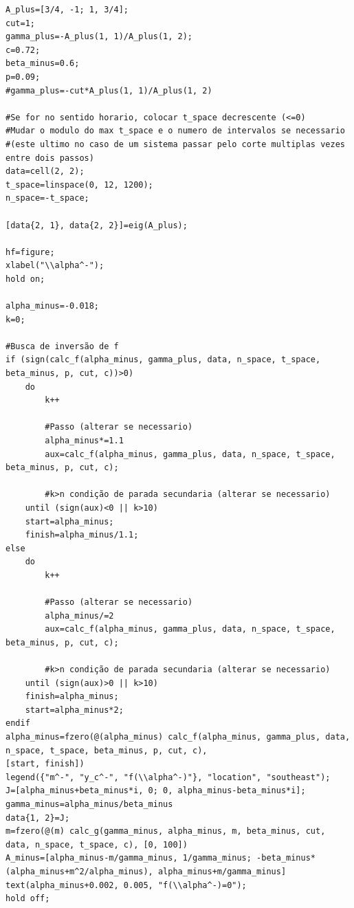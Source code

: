 \begin{lstlisting}[caption={Imposi\c{c}\~{a}o de $f'(\alpha^-)=0$ e $g(m^-)=0$ dado $\gamma^+$, $p$, $c$ e $\beta^-$ fixos.}, captionpos=b]
A_plus=[3/4, -1; 1, 3/4];
cut=1;
gamma_plus=-A_plus(1, 1)/A_plus(1, 2);
c=0.72;
beta_minus=0.6;
p=0.09;
#gamma_plus=-cut*A_plus(1, 1)/A_plus(1, 2)

#Se for no sentido horario, colocar t_space decrescente (<=0)
#Mudar o modulo do max t_space e o numero de intervalos se necessario 
#(este ultimo no caso de um sistema passar pelo corte multiplas vezes entre dois passos)
data=cell(2, 2);
t_space=linspace(0, 12, 1200);
n_space=-t_space;

[data{2, 1}, data{2, 2}]=eig(A_plus);

hf=figure;
xlabel("\\alpha^-");
hold on;

alpha_minus=-0.018;
k=0;

#Busca de inversão de f
if (sign(calc_f(alpha_minus, gamma_plus, data, n_space, t_space, beta_minus, p, cut, c))>0)
    do  
        k++
        
        #Passo (alterar se necessario)
        alpha_minus*=1.1
        aux=calc_f(alpha_minus, gamma_plus, data, n_space, t_space, beta_minus, p, cut, c);
        
        #k>n condição de parada secundaria (alterar se necessario)
    until (sign(aux)<0 || k>10)
    start=alpha_minus;
    finish=alpha_minus/1.1;
else
    do
        k++
        
        #Passo (alterar se necessario)
        alpha_minus/=2
        aux=calc_f(alpha_minus, gamma_plus, data, n_space, t_space, beta_minus, p, cut, c);
        
        #k>n condição de parada secundaria (alterar se necessario)
    until (sign(aux)>0 || k>10)
    finish=alpha_minus;
    start=alpha_minus*2;
endif
alpha_minus=fzero(@(alpha_minus) calc_f(alpha_minus, gamma_plus, data, n_space, t_space, beta_minus, p, cut, c),
[start, finish])
legend({"m^-", "y_c^-", "f(\\alpha^-)"}, "location", "southeast");
J=[alpha_minus+beta_minus*i, 0; 0, alpha_minus-beta_minus*i];
gamma_minus=alpha_minus/beta_minus
data{1, 2}=J;
m=fzero(@(m) calc_g(gamma_minus, alpha_minus, m, beta_minus, cut, data, n_space, t_space, c), [0, 100])
A_minus=[alpha_minus-m/gamma_minus, 1/gamma_minus; -beta_minus*(alpha_minus+m^2/alpha_minus), alpha_minus+m/gamma_minus]
text(alpha_minus+0.002, 0.005, "f(\\alpha^-)=0");
hold off;  
\end{lstlisting}
